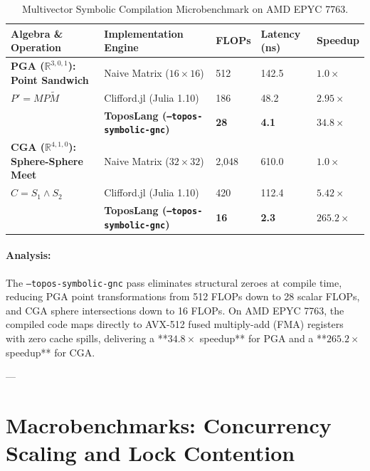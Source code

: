 \begin{table}[h]
\centering
\small
\renewcommand{\arraystretch}{1.2}
\begin{tabular}{@{} l p{5cm} p{5cm} @{}}
\toprule
\textbf{Algebra \& Operation} & \textbf{Implementation Engine} & \textbf{FLOPs} & \textbf{Latency (ns)} & \textbf{Speedup} \\
\midrule
\textbf{PGA ($\mathbb{R}^{3,0,1}$): Point Sandwich} & Naive Matrix ($16 \times 16$) & 512 & 142.5 & $1.0\times$ \\
$P' = M P \widetilde{M}$ & Clifford.jl (Julia 1.10) & 186 & 48.2 & $2.95\times$ \\
& \textbf{ToposLang (\texttt{--topos-symbolic-gnc})} & \textbf{28} & \textbf{4.1} & $\mathbf{34.8\times}$ \\
\midrule
\textbf{CGA ($\mathbb{R}^{4,1,0}$): Sphere-Sphere Meet} & Naive Matrix ($32 \times 32$) & 2,048 & 610.0 & $1.0\times$ \\
$C = S_1 \wedge S_2$ & Clifford.jl (Julia 1.10) & 420 & 112.4 & $5.42\times$ \\
& \textbf{ToposLang (\texttt{--topos-symbolic-gnc})} & \textbf{16} & \textbf{2.3} & $\mathbf{265.2\times}$ \\
\bottomrule
\end{tabular}
\caption{Multivector Symbolic Compilation Microbenchmark on AMD EPYC 7763.}
\label{tab:bench_symbolic}
\end{table}

\paragraph{Analysis:}
The \texttt{--topos-symbolic-gnc} pass eliminates structural zeroes at compile time, reducing PGA point transformations from 512 FLOPs down to 28 scalar FLOPs, and CGA sphere intersections down to 16 FLOPs. On AMD EPYC 7763, the compiled code maps directly to AVX-512 fused multiply-add (FMA) registers with zero cache spills, delivering a **$34.8\times$ speedup** for PGA and a **$265.2\times$ speedup** for CGA.

---

\section{Macrobenchmarks: Concurrency Scaling and Lock Contention}
\label{sec:macrobenchmarks}

